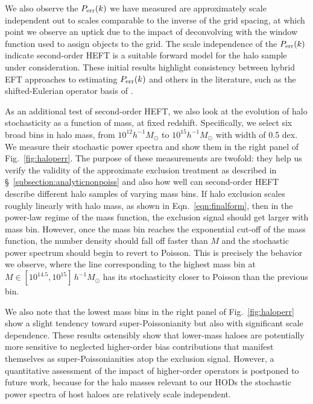 \documentclass[fleqn,usenatbib]{mnras}
\begin{document}
We also observe the $P_{\rm err} (k)$ we have measured are approximately scale independent out to scales comparable to the inverse of the grid spacing, at which point we observe an uptick due to the impact of deconvolving with the window function used to assign objects to the grid. The scale independence of the $P_{\rm err}(k)$ indicate second-order HEFT is a suitable forward model for the halo sample under consideration. These initial results highlight consistency between hybrid EFT approaches to estimating $P_{\rm err}(k)$ and others in the literature, such as the shifted-Eulerian operator basis of \cite{Schmittfull_2019}. \par
As an additional test of second-order HEFT, we also look at the evolution of halo stochasticity as a function of mass, at fixed redshift. Specifically, we select six broad bins in halo mass, from $10^{12} h^{-1}M_\odot$ to $10^{15} h^{-1}M_\odot $ with width of 0.5 dex. We measure their stochastic power spectra and show them in the right panel of Fig.~\ref{fig:haloperr}. The purpose of these measurements are twofold: they help us verify the validity of the approximate exclusion treatment as described in \S~\ref{subsection:analyticnonpoiss} and also how well can second-order HEFT describe different halo samples of varying mass bins. If halo exclusion scales roughly linearly with halo mass, as shown in Eqn.~\ref{eqn:finalform}, then in the power-law regime of the mass function, the exclusion signal should get larger with mass bin. However, once the mass bin reaches the exponential cut-off of the mass function,  the number density should fall off faster than $M$ and the stochastic power spectrum should begin to revert to Poisson. This is precisely the behavior we observe, where the line corresponding to the highest mass bin at $M \in [10^{14.5}, 10^{15}]\, h^{-1} M_\odot$ has its stochasticity closer to Poisson than the previous bin. \par 
We also note that the lowest mass bins in the right panel of Fig.~\ref{fig:haloperr} show a slight tendency toward super-Poissonianity but also with significant scale dependence. These results ostensibly show that lower-mass haloes are potentially more sensitive to neglected higher-order bias contributions that manifest themselves as super-Poissonianities atop the exclusion signal. However, a quantitative assessment of the impact of higher-order operators is postponed to future work, because for the halo masses relevant to our HODs the stochastic power spectra of host haloes are relatively scale independent.
\end{document}
